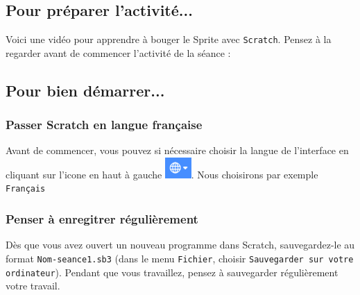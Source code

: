 \subsection{Pour préparer l'activité...}

\vspace{10pt}

Voici une vidéo pour apprendre à bouger le Sprite avec \texttt{Scratch}. Pensez à la regarder avant de commencer l'activité de la séance :

\begin{center}
\end{center}

\vspace{12pt}

\subsection{Pour bien démarrer...}

\subsubsection{Passer Scratch en langue française} 

Avant de commencer, vous pouvez si nécessaire choisir la langue de l'interface en cliquant sur l'icone en haut à gauche  \includegraphics[width=1cm]{./images/scratch03/changerLangue.png}. Nous choisirons par exemple \texttt{Français}




\subsubsection{Penser à enregitrer régulièrement}

Dès que vous avez ouvert un nouveau programme dans Scratch, sauvegardez-le au format \texttt{Nom-seance1.sb3} (dans le menu \texttt{Fichier}, choisir \texttt{Sauvegarder sur votre ordinateur}). Pendant que vous travaillez, pensez à sauvegarder régulièrement votre travail.   

